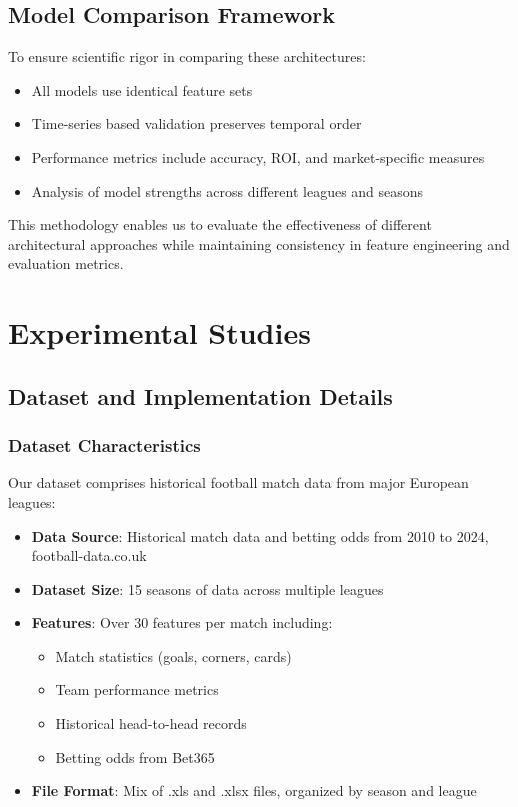 \documentclass[conference]{IEEEtran}
\begin{document}
\subsection{Model Comparison Framework}
To ensure scientific rigor in comparing these architectures:
\begin{itemize}
    \item All models use identical feature sets
    \item Time-series based validation preserves temporal order
    \item Performance metrics include accuracy, ROI, and market-specific measures
    \item Analysis of model strengths across different leagues and seasons
\end{itemize}

This methodology enables us to evaluate the effectiveness of different architectural approaches while maintaining consistency in feature engineering and evaluation metrics.

\section{Experimental Studies}
\subsection{Dataset and Implementation Details}
\subsubsection{Dataset Characteristics}
Our dataset comprises historical football match data from major European leagues:
\begin{itemize}
\item \textbf{Data Source}: Historical match data and betting odds from 2010 to 2024, football-data.co.uk
\item \textbf{Dataset Size}: 15 seasons of data across multiple leagues
\item \textbf{Features}: Over 30 features per match including:
    \begin{itemize}
    \item Match statistics (goals, corners, cards)
    \item Team performance metrics
    \item Historical head-to-head records
    \item Betting odds from Bet365
    \end{itemize}
\item \textbf{File Format}: Mix of .xls and .xlsx files, organized by season and league
\end{itemize}
\end{document}
